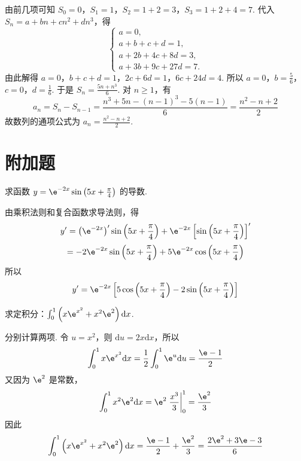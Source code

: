 \begin{solution}
由前几项可知 \(S_0=0\)，\(S_1=1\)，\(S_2=1+2=3\)，\(S_3=1+2+4=7\). 代入 \(S_n=a+bn+cn^2+dn^3\)，得
\[
\begin{cases}
a=0,\\
a+b+c+d=1,\\
a+2b+4c+8d=3,\\
a+3b+9c+27d=7.
\end{cases}
\]
由此解得 \(a=0\)，\(b+c+d=1\)，\(2c+6d=1\)，\(6c+24d=4\). 所以
\(a=0\)，\(b=\frac{5}{6}\)，\(c=0\)，\(d=\frac{1}{6}\).
于是 \(S_n=\frac{5n+n^3}{6}\). 对 \(n\geqslant1\)，有
\[
a_n=S_n-S_{n-1}=\frac{n^3+5n-(n-1)^3-5(n-1)}{6}=\frac{n^2-n+2}{2}
\]
故数列的通项公式为 \(a_n=\frac{n^2-n+2}{2}\).
\end{solution}

\section{附加题}

\begin{problem}
求函数 \(y=\e^{-2x}\sin\left(5x+\frac{\pi}{4}\right)\) 的导数.
\end{problem}

\begin{solution}
由乘积法则和复合函数求导法则，得
\[
y'=\left(\e^{-2x}\right)'\sin\left(5x+\frac{\pi}{4}\right)+\e^{-2x}\left[\sin\left(5x+\frac{\pi}{4}\right)\right]'
\]
\[
=-2\e^{-2x}\sin\left(5x+\frac{\pi}{4}\right)+5\e^{-2x}\cos\left(5x+\frac{\pi}{4}\right)
\]
所以
\[
y'=\e^{-2x}\left[5\cos\left(5x+\frac{\pi}{4}\right)-2\sin\left(5x+\frac{\pi}{4}\right)\right]
\]
\end{solution}

\begin{problem}
求定积分：\(\int_0^1\left(x\e^{x^2}+x^2\e^2\right)\mathrm{d}x\).
\end{problem}

\begin{solution}
分别计算两项. 令 \(u=x^2\)，则 \(\mathrm{d}u=2x\mathrm{d}x\)，所以
\[
\int_0^1x\e^{x^2}\mathrm{d}x=\frac{1}{2}\int_0^1\e^u\mathrm{d}u=\frac{\e-1}{2}
\]
又因为 \(\e^2\) 是常数，
\[
\int_0^1x^2\e^2\mathrm{d}x=\e^2\left.\frac{x^3}{3}\right|_0^1=\frac{\e^2}{3}
\]
因此
\[
\int_0^1\left(x\e^{x^2}+x^2\e^2\right)\mathrm{d}x=\frac{\e-1}{2}+\frac{\e^2}{3}=\frac{2\e^2+3\e-3}{6}
\]
\end{solution}

